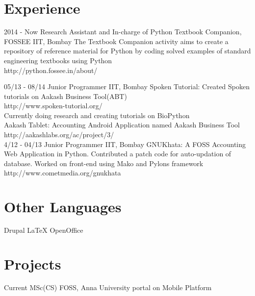 \documentclass[]{friggeri-cv}
\begin{document}
\section{Experience}
\begin{entrylist}
  \entry
    {2014 - Now}
    {Research Assistant and In-charge of Python Textbook Companion, FOSSEE}
    {IIT, Bombay}
    {The Textbook Companion activity aims to create a repository of reference material for Python by coding solved examples of standard engineering textbooks using Python\\
    http://python.fossee.in/about/}
    
  \entry
    {05/13 - 08/14}
    {Junior Programmer}
    {IIT, Bombay}
    {Spoken Tutorial: Created Spoken tutorials on Aakash Business Tool(ABT)\\
http://www.spoken-tutorial.org/ \\ Currently doing research and creating tutorials
on BioPython \\
Aakash Tablet: Accounting Android Application named Aakash Business Tool\\
http://aakashlabs.org/ac/project/3/\\}
    \entry
    {4/12 - 04/13}
    {Junior Programmer}
    {IIT, Bombay}
    {GNUKhata: A FOSS Accounting Web Application in Python. Contributed a
patch code for auto-updation of database. Worked on front-end using Mako and
Pylons framework\\
http://www.cometmedia.org/gnukhata
\\}
   \end{entrylist}
   
   \section{Other Languages}
\begin{entrylist}
  \entry
    {}
    {Drupal}
    {}
    {\emph{}}
     \entry
    {}
    {LaTeX}
    {}
    {\emph{}}
     \entry
    {}
    {OpenOffice}
    {}
    {\emph{}}
\end{entrylist}

   \section{Projects}
\begin{entrylist}
  \entry
    {Current}
    {MSc(CS) FOSS, Anna University portal on Mobile Platform}
    {}
    {\emph{}}
  
    
\end{entrylist}
\end{document}
